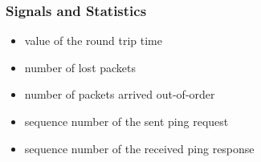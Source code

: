 \subsubsection*{Signals and Statistics}

\begin{itemize}
  \item {} value of the round trip time
  \item {} number of lost packets
  \item {} number of packets arrived out-of-order
  \item {} sequence number of the sent ping request
  \item {} sequence number of the received ping response
\end{itemize}



